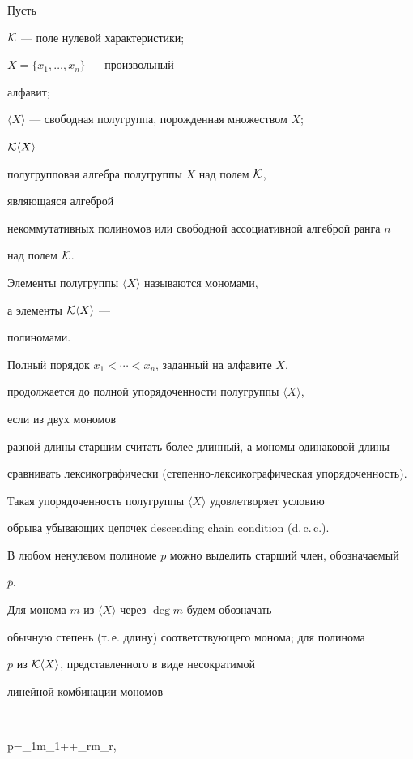 Пусть


${\cal K}$ --- поле нулевой характеристики;


$X=\lbrace x_{1},\dotsc, x_{n}\rbrace$ --- произвольный


алфавит;


$\langle X\rangle$ --- свободная полугруппа, порожденная множеством $X$;


${\cal K}\langle X\rangle$ ---


полугрупповая алгебра полугруппы $X$ над полем ${\cal K}$,


являющаяся алгеброй


некоммутативных полиномов или свободной ассоциативной алгеброй ранга $n$


над полем ${\cal K}$.


Элементы полугруппы $\langle X\rangle$ называются мономами,


а элементы ${\cal K}\langle X\rangle$ ---


полиномами.





Полный порядок $x_{1}<\dotsb <x_{n}$, заданный на алфавите $X$,


продолжается до полной упорядоченности полугруппы $\langle X\rangle$,


если из двух мономов


разной длины старшим считать более длинный, а мономы одинаковой длины


сравнивать лексикографически (степенно-лексикографическая упорядоченность).


Такая упорядоченность полугруппы $\langle X\rangle$ удовлетворяет условию


обрыва убывающих цепочек descending chain condition (d.\,c.\,c.).





В любом ненулевом полиноме $p$ можно выделить старший член, обозначаемый


$\overline{p}$.


Для монома $m$ из $\langle X\rangle$ через $\deg m$ будем обозначать


обычную степень (т.\,е. длину) соответствующего монома; для полинома


$p$ из ${\cal K}\langle X\rangle$, представленного в виде несократимой


линейной комбинации  мономов


$$


p=\alpha_{1}m_{1}+\dotsb +\alpha_{r}m_{r},


